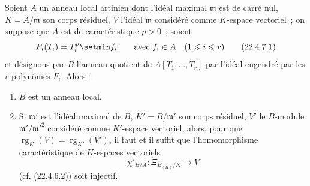 \begin{proposition}[22.4.7]
\label{0.22.4.7-fr}
Soient $A$ un anneau local artinien dont l'idéal maximal $\mathfrak m$ est de
carré nul, $K=A/\mathfrak m$ son corps résiduel, $V$ l'idéal $\mathfrak m$
considéré comme $K$-espace vectoriel~; on suppose que $A$ est de
caractéristique $p>0$~; soient
\begin{equation}
\label{0.22.4.7.1-fr}
  F_i(T_i)=T_i^p\setmin f_i\qquad\text{avec }f_i\in A\quad(1\leqslant i\leqslant r)
  \tag{22.4.7.1}
\end{equation}
et désignons par $B$ l'anneau quotient de $A[T_1,\ldots,T_r]$ par l'idéal
engendré par les $r$ polynômes $F_i$. Alors~:
\begin{enumerate}
  \item[\rm(i)] $B$ est un anneau local.
  \item[\rm(ii)] Si $\mathfrak m'$ est l'idéal maximal de $B$,
  $K'=B/\mathfrak m'$ son corps résiduel, $V'$ le $B$-module
  $\mathfrak m'/\mathfrak m'^2$ considéré comme $K'$-espace vectoriel, alors,
  pour que $\operatorname{rg}_K(V)=\operatorname{rg}_{K'}(V')$, il faut et il suffit que l'homomorphisme
  caractéristique de $K$-espaces vectoriels
  \begin{equation}
  \label{0.22.4.7.2-fr}
    \chi'_{B/A}:\Xi_{B_{(K)}/K}\longrightarrow V
    \tag{22.4.7.2}
  \end{equation}
  \textup{(cf. (22.4.6.2))} soit injectif.
\end{enumerate}
\end{proposition}

